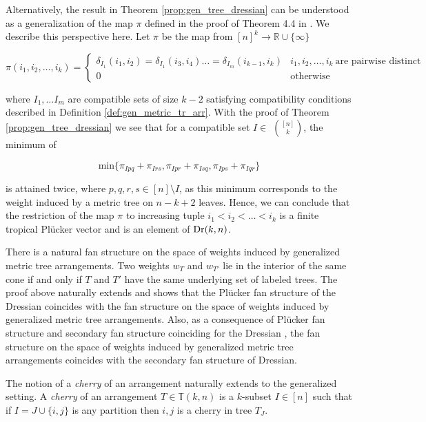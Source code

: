 \documentclass[10pt,a4paper]{amsart}
\newcommand{\TT}{\mathbb{T}}
\DeclareMathOperator{\Dr}{\rm Dr}
\theoremstyle{plain}
\theoremstyle{definition}
\numberwithin{subcase}{case}
\begin{document}
Alternatively, the result in Theorem \ref{prop:gen_tree_dressian} can be understood as a generalization of the map $\pi$ defined in the proof of Theorem 4.4 in \cite{herrmann2009draw}. We describe this perspective here. Let $\pi$ be the map from $[n]^{k} \rightarrow \mathbb{R} \cup \{\infty\} $

\[ \pi(i_{1}, i_{2}, \hdots , i_{k}) = \begin{cases}
  \delta_{I_{1}}(i_{1},i_{2}) =  \delta_{I_{1}}(i_{3},i_{4}) \hdots = \delta_{I_{m}}(i_{k-1},i_{k}) &  i_{1}, i_{2}, \hdots , i_{k} \> \text{are pairwise distinct} \\    
  0 & \text{otherwise}    
\end{cases} \]

where $I_{1}, \hdots I_{m}$ are compatible sets of size $k-2$ satisfying compatibility conditions described in Definition \ref{def:gen_metric_tr_arr}. With the proof of Theorem \ref{prop:gen_tree_dressian} we see that for a compatible set $I \in$ $\binom{[n]}{k}$, the minimum of 

\[ \text{min} \{ \pi_{Ipq} + \pi_{Irs} , \pi_{Ipr} + \pi_{Isq} , \pi_{Ips} + \pi_{Iqr} \} \]

is attained twice, where $p,q,r,s \in [n] \setminus I$, as this minimum corresponds to the weight induced by a metric tree on $n-k+2$ leaves. Hence, we can conclude that the restriction of the map $\pi$ to increasing tuple $i_{1} < i_{2} < \hdots < i_{k}$ is a finite tropical Pl\"ucker vector and is an element of $\Dr(k,n)$.


There is a natural fan structure on the space of weights induced by generalized metric tree arrangements. Two weights $w_T$ and $w_{T'}$ lie in the interior of the same cone if and only if $T$ and $T'$ have the same underlying set of labeled trees. The proof above naturally extends and shows that the Pl\"ucker fan structure of the Dressian coincides with the fan structure on the space of weights induced by generalized metric tree arrangements. Also, as a consequence of Pl\"ucker fan structure and secondary fan structure coinciding for the Dressian \cite{olarte2019local}, the fan structure on the space of weights induced by generalized metric tree arrangements coincides with the secondary fan structure of Dressian. 

The notion of a \textit{cherry} of an arrangement naturally extends to the generalized setting. A \textit{cherry} of an arrangement $T \in \TT(k,n)$ is a $k$-subset $I \in [n]$ such that if $I = J \cup \{i,j\}$ is any partition then $i,j$ is a cherry in tree $T_J$.
\bigskip
\end{document}
